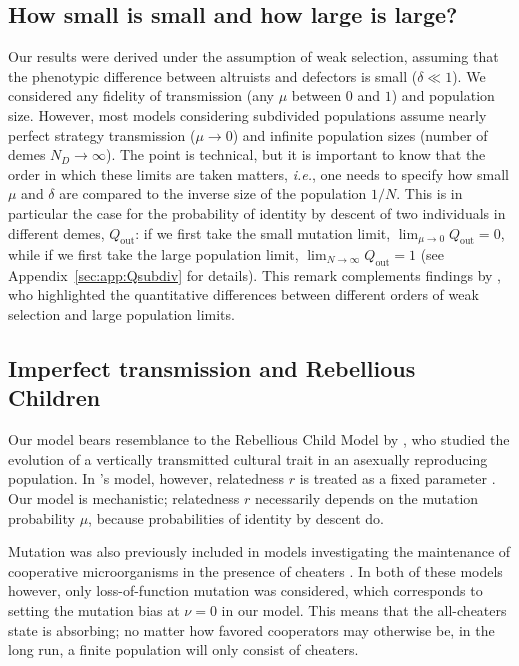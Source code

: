 \documentclass[11pt, letterpaper]{article}
\newcommand{\ie}{\textit{i.e.}}
\newcommand{\appname}[0]{Appendix}
\newcommand{\mutbias}{\nu}
\newcommand{\out}{\textrm{out}}
\newcommand{\ndemes}{N_D}
\newcommand{\selstr}{\delta}
\begin{document}
\subsection*{How small is small and how large is large?}
Our results were derived under the assumption of weak selection, assuming that the phenotypic difference between altruists and defectors is small ($\selstr \ll 1$). We considered any fidelity of transmission (any $\mu$ between $0$ and $1$) and population size. However, most models considering subdivided populations assume nearly perfect strategy transmission ($\mu \to 0$) and infinite population sizes (number of demes $\ndemes \to \infty$). The point is technical, but it is important to know that the order in which these limits are taken matters, \ie, one needs to specify how small $\mu$ and $\selstr$ are compared to the inverse size of the population $1/N$. This is in particular the case for the probability of identity by descent of two individuals in different demes, $Q_{\out}$: if we first take the small mutation limit, $\lim_{\mu \to 0} Q_{\out} = 0$, while if we first take the large population limit, $\lim_{N\to \infty} Q_{\out} = 1$ (see \appname~\ref{sec:app:Qsubdiv} for details). 
This remark complements findings by \citet{SampleAllen2017}, who highlighted the quantitative differences between different orders of weak selection and large population limits. 

\subsection*{Imperfect transmission and Rebellious Children}
Our model bears resemblance to the Rebellious Child Model by \citet{Frank1997}, who studied the evolution of a vertically transmitted cultural trait in an asexually reproducing population. In \citeauthor{Frank1997}'s model, however, relatedness $r$ is treated as a fixed parameter \citep[legend of Figure~7]{Frank1997}. 
Our model is mechanistic; relatedness $r$ necessarily depends on the mutation probability $\mu$, because probabilities of identity by descent do. 

Mutation was also previously included in models investigating the maintenance of cooperative microorganisms in the presence of cheaters \citep{Brockhurst2007, Frank2010}. In both of these models however, only loss-of-function mutation was considered, which corresponds to setting the mutation bias at $\mutbias=0$ in our model. This means that the all-cheaters state is absorbing; no matter how favored cooperators may otherwise be, in the long run, a finite population will only consist of cheaters. 
\end{document}
